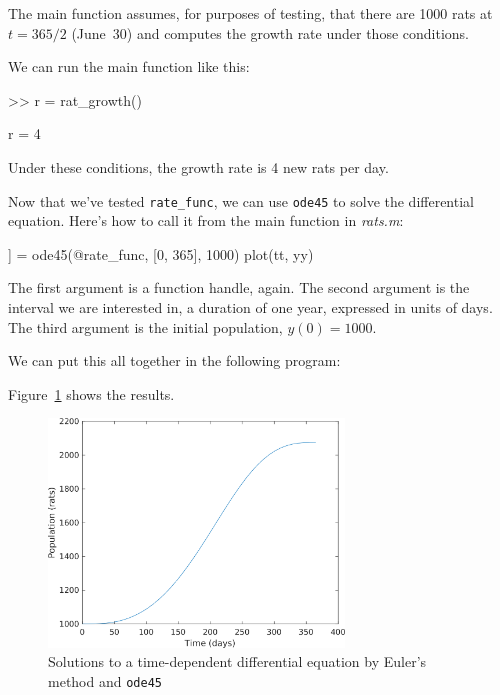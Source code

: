 The main function assumes, for purposes of testing, that
there are 1000 rats at $t=365/2$ (June~30) and computes the growth rate under those conditions.

We can run the main function like this:

\begin{code}
>> r = rat_growth()

r = 4
\end{code}

Under these conditions, the growth rate is 4 new rats per day.

Now that we've tested \lstinline{rate_func}, we can use \lstinline{ode45} to solve the differential equation.
Here's how to call it from the main function in \emph{rats.m}:

\begin{code}
[tt, yy]] = ode45(@rate_func, [0, 365], 1000)
plot(tt, yy)
\end{code}

The first argument is a function handle, again.  The second argument is the interval we are interested in, a duration of one year, expressed in units of days.
The third argument is the initial population, $y(0) = 1000$.


We can put this all together in the following program:


Figure~\ref{fig:rats} shows the results.

\begin{figure}[ht]
\centerline{\includegraphics[width=0.7\textwidth]{../code/chap_odes/rats.png}}
\caption{Solutions to a time-dependent differential equation by Euler's method and \lstinline{ode45}}
\label{fig:rats}
\end{figure}


